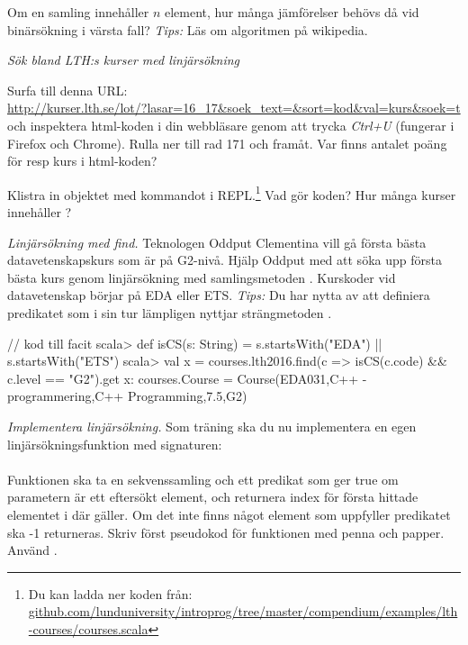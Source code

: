 \Subtask\Pen Om en samling innehåller $n$ element, hur många jämförelser behövs då vid binärsökning i värsta fall? \emph{Tips:} Läs om algoritmen på wikipedia.







\Task \label{task:linsearch-lth}\emph{Sök bland LTH:s kurser med linjärsökning} 

\Subtask Surfa till denna URL:\\ {\nolinebreak[4]\footnotesize\url{http://kurser.lth.se/lot/?lasar=16_17&soek_text=&sort=kod&val=kurs&soek=t}}
\\
och inspektera html-koden i din webbläsare genom att trycka \emph{Ctrl+U} (fungerar i Firefox och Chrome). Rulla ner till rad 171 och framåt. Var finns antalet poäng för resp kurs i html-koden?

\Subtask \label{subtask:download-lthcourses} Klistra in objektet  med kommandot  i REPL.\footnote{Du kan ladda ner koden från: \\ \href{https://raw.githubusercontent.com/lunduniversity/introprog/master/compendium/examples/lth-courses/courses.scala}{github.com/lunduniversity/introprog/tree/master/compendium/examples/lth-courses/courses.scala}} Vad gör koden? Hur många kurser innehåller ?


\Subtask \emph{Linjärsökning med find.} Teknologen Oddput Clementina vill gå första bästa datavetenskapskurs som är på G2-nivå. Hjälp Oddput med att söka upp första bästa kurs genom linjärsökning med samlingsmetoden . Kurskoder vid datavetenskap börjar på EDA eller ETS. \emph{Tips:} Du har nytta av att definiera predikatet  som i sin tur lämpligen nyttjar strängmetoden .

\begin{REPL}
// kod till facit
scala> def isCS(s: String) = s.startsWith("EDA") || s.startsWith("ETS")
scala> val x = courses.lth2016.find(c => isCS(c.code) && c.level == "G2").get
x: courses.Course = Course(EDA031,C++ - programmering,C++ Programming,7.5,G2)
\end{REPL}

\Subtask \emph{Implementera linjärsökning.} Som träning ska du nu implementera en egen linjärsökningsfunktion med signaturen: \\ 
\\ Funktionen ska ta en sekvenssamling  och ett predikat  som ger true om parametern är ett eftersökt element, och returnera index för första hittade elementet i  där  gäller. Om det inte finns något element som uppfyller predikatet ska -1 returneras. Skriv först pseudokod för funktionen med penna och papper. Använd . 

